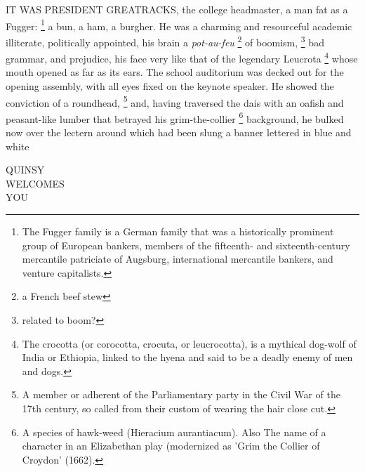   IT WAS PRESIDENT GREATRACKS, the college headmaster, a man fat as a Fugger: 
\footnote{ \textdbend The Fugger family is a
German family that was a historically prominent group of European bankers,
members of the fifteenth- and sixteenth-century mercantile patriciate of
Augsburg, international mercantile bankers, and venture capitalists. 
}
a bun, a ham, 
a burgher. 
He was a charming and resourceful academic illiterate,
politically appointed, his brain a \textit{pot-au-feu}
\footnote{ a French beef stew}
of boomism, 
\footnote{ \textdbend related to boom?}
bad grammar, and prejudice, his face very like that of the legendary Leucrota 
\footnote{ The crocotta (or corocotta, crocuta, or leucrocotta), is a mythical
dog-wolf of India or Ethiopia, linked to the hyena and said to be a deadly enemy
of men and dogs.
}
whose mouth opened as far as its ears. The school auditorium was decked 
out for the opening
assembly, with all eyes fixed on the keynote speaker. He showed the conviction
of a roundhead, 
\footnote{ A member or adherent of the Parliamentary party in the Civil War of
  the 17th century, so called from their custom of wearing the hair close cut.}
and, having traversed the dais 
with an oafish 
and peasant-like lumber 
that betrayed his grim-the-collier 
\footnote{ A species of hawk-weed (Hieracium aurantiacum). Also The name of a
character in an Elizabethan play (modernized as 'Grim the Collier of 
Croydon' (1662). 
}
background, he bulked now over the lectern around which had been slung 
a banner lettered in blue and white
 
\begin{center}
            QUINSY   \\
           WELCOMES  \\
             YOU
\end{center}
 
